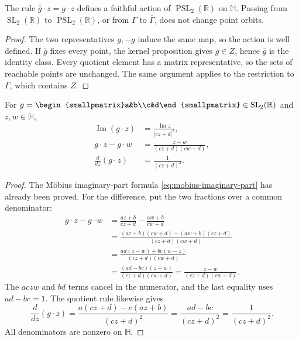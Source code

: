 \begin{corollary}\label{hyperbolic.faithful-quotient}
The rule $\overline g\cdot z=g\cdot z$ defines a faithful action of $\operatorname{PSL}_2(\mathbb R)$ on $\mathbb H$. Passing from $\operatorname{SL}_2(\mathbb R)$ to $\operatorname{PSL}_2(\mathbb R)$, or from $\Gamma$ to $\overline\Gamma$, does not change point orbits.
\end{corollary}

\begin{proof}
The two representatives $g,-g$ induce the same map, so the action is well defined. If $\overline g$ fixes every point, the kernel proposition gives $g\in Z$, hence $\overline g$ is the identity class. Every quotient element has a matrix representative, so the sets of reachable points are unchanged. The same argument applies to the restriction to $\Gamma$, which contains $Z$.
\end{proof}

\begin{proposition}\label{hyperbolic.mobius}
For $g=\begin{smallpmatrix}a&b\\c&d\end{smallpmatrix}\in\operatorname{SL}_2(\mathbb R)$ and $z,w\in\mathbb H$,
\begin{equation}\label{eq:mobius-identities}
 \begin{aligned}
 \operatorname{Im}(g\cdot z)&=\frac{\operatorname{Im}z}{|cz+d|^2},\\
 g\cdot z-g\cdot w&=\frac{z-w}{(cz+d)(cw+d)},\\
 \frac{d}{dz}(g\cdot z)&=\frac1{(cz+d)^2}.
 \end{aligned}
\end{equation}
\end{proposition}

\begin{proof}
The Möbius imaginary-part formula \eqref{eq:mobius-imaginary-part} has already been proved. For the difference, put the two fractions over a common denominator:
\[
 \begin{aligned}
 g\cdot z-g\cdot w
 &=\frac{az+b}{cz+d}-\frac{aw+b}{cw+d}\\
 &=\frac{(az+b)(cw+d)-(aw+b)(cz+d)}{(cz+d)(cw+d)}\\
 &=\frac{ad(z-w)+bc(w-z)}{(cz+d)(cw+d)}\\
 &=\frac{(ad-bc)(z-w)}{(cz+d)(cw+d)}
  =\frac{z-w}{(cz+d)(cw+d)}.
 \end{aligned}
\]
The $aczw$ and $bd$ terms cancel in the numerator, and the last equality uses $ad-bc=1$. The quotient rule likewise gives
\[
 \frac{d}{dz}(g\cdot z)
 =\frac{a(cz+d)-c(az+b)}{(cz+d)^2}
 =\frac{ad-bc}{(cz+d)^2}
 =\frac1{(cz+d)^2}.
\]
All denominators are nonzero on $\mathbb H$.
\end{proof}
